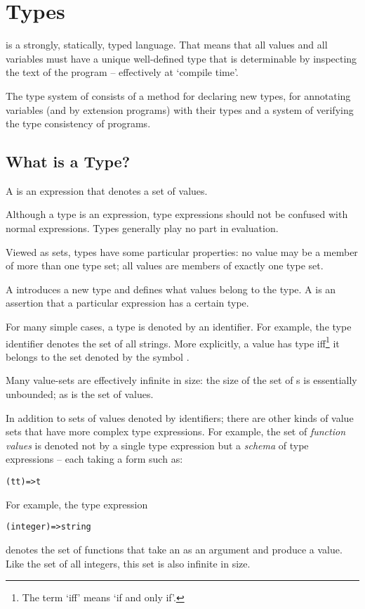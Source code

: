 \chapter{Types}
\label{types}
\Sr is a strongly, statically, typed language. That means that all values and all variables must have a unique well-defined type that is determinable by inspecting the text of the program -- effectively at `compile time'.

The type system of \Sr consists of a method for declaring new types, for annotating variables (and by extension programs) with their types and a system of verifying the type consistency of programs.

\section{What is a Type?}
A  is an expression that denotes a set of values. 
\begin{aside}
Although a type is an expression, type expressions should not be confused with normal expressions. Types generally play no part in evaluation.
\end{aside}
Viewed as sets, types have some particular properties: no value may be a member of more than one type set; all values are members of exactly one type set.

A  introduces a new type and defines what values belong to the type. A  is an assertion that a particular expression has a certain type.

For many simple cases, a type is denoted by an identifier. For example, the type identifier  denotes the set of all strings. More explicitly, a value has type  iff\footnote{The term `iff' means `if and only if'.} it belongs to the set denoted by the symbol .

Many value-sets are effectively infinite in size: the size of the set of s is essentially unbounded; as is the set of  values.

In addition to sets of values denoted by identifiers; there are other kinds of value sets that have more complex type expressions. For example, the set of \emph{function values} is denoted not by a single type expression but a \emph{schema} of type expressions -- each taking a form such as:
\begin{alltt}
(t\sequence{,}t\subn)=>t
\end{alltt}
For example, the type expression
\begin{alltt}
(integer)=>string
\end{alltt}
denotes the set of functions that take an  as an argument and produce a  value. Like the set of all integers, this set is also infinite in size.

